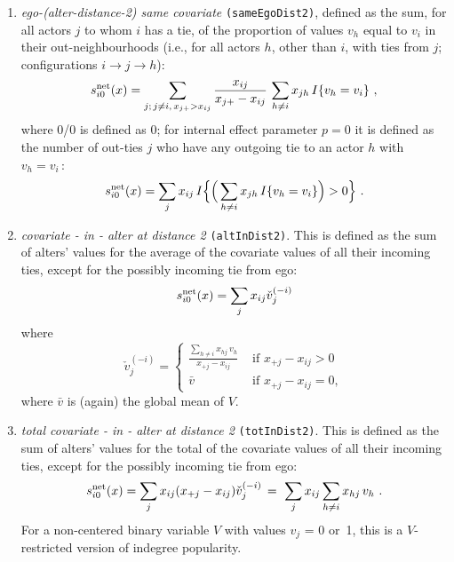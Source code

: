 \documentclass[a4paper,fleqn,11pt]{article}
\newcommand{\+}{\, + \,}
\newcommand{\vit}{\theenumi}
\begin{document}
\begin{enumerate}
\item \emph{ego-(alter-distance-2) same covariate} \texttt{(sameEgoDist2)},
      defined as the sum, for all actors $j$ to whom $i$ has a tie,
      of the proportion of values $v_h$ equal to $v_i$
      in their out-neighbourhoods (i.e., for all actors $h$, other than $i$,
      with ties from $j$; configurations $i \rightarrow j \rightarrow h$):
\[
 s^{\rm net}_{i\vit}(x) = \sum_{j;\, j \neq i, \, x_{j+} > x_{ij} } \frac{x_{ij}}{x_{j+} - x_{ij}}
                        \, \sum_{h \neq i} x_{jh}\, I\{v_h = v_i\} \ ,
\]
where 0/0 is defined as 0; for internal effect parameter $p=0$ it is defined
as the number of out-ties $j$ who have any outgoing tie to an actor $h$
with $v_h = v_i\,$:
\[
 s^{\rm net}_{i\vit}(x) = \sum_j x_{ij}\,
                I\Big\{ \Big( \sum_{h \neq i} x_{jh}\, I\{v_h = v_i\}\Big) > 0 \Big\} \ .
\]

\item \emph{covariate - in - alter at distance 2} \texttt{(altInDist2)}.
     This is defined as the sum of alters' values for
     the average of the covariate values of all their
     incoming ties, except for the possibly incoming tie from ego:
\[
 s^{\rm net}_{i\vit}(x) = \sum_j x_{ij} \check v_j^{(-i)}
\]
      where
\begin{equation}
  \check v_j^{(-i)} = \left\{\begin{array}{ll} \displaystyle
         \frac{\sum_{h \neq i} x_{hj}\,v_h}{x_{+j} - x_{ij}}  &
                                       \text{ if } x_{+j} - x_{ij} > 0     \\
         \bar v                                &  \text{ if } x_{+j}- x_{ij} = 0  ,
  \end{array}   \right.            \label{alt_inav2}
\end{equation}
where $\bar v$ is (again) the global mean of $V$.


\item \emph{total covariate - in - alter at distance 2} \texttt{(totInDist2)}.
     This is defined as the sum of alters' values for
     the total of the covariate values of all their incoming ties,
     except for the possibly incoming tie from ego:
\[
 s^{\rm net}_{i\vit}(x) = \sum_j x_{ij} (x_{+j} - x_{ij}) \check v_j^{(-i)}
                        \,=\ \sum_j x_{ij} \sum_{h \neq i} x_{hj}\,v_h  \ .
\]
    For a non-centered binary variable $V$ with values $v_j$ = 0 or~1,
    this is a $V$-restricted version of indegree popularity.


\end{enumerate}
\end{document}
